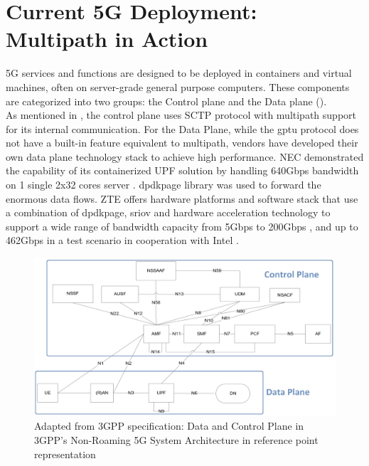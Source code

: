 \section{Current 5G Deployment: Multipath in Action}
5G services and functions are designed to be deployed in containers and virtual machines, often on server-grade general purpose computers.
These components are categorized into two groups: the Control plane and the Data plane ().
\\

As mentioned in , the control plane uses \ac{SCTP} protocol with multipath support for its internal communication.
For the Data Plane, while the \ac{gptu} protocol does not have a built-in feature equivalent to multipath, vendors have developed their own data plane technology stack to achieve high performance.
\ac{NEC} demonstrated the capability of its containerized \ac{UPF} solution by handling 640Gbps bandwidth on 1 single 2x32 cores server \cite{nec_upf_whitepaper}.
\ac{dpdkpage} library was used to forward the enormous data flows.
\ac{ZTE} offers hardware platforms and software stack that use a combination of \ac{dpdkpage}, \ac{sriov} and hardware acceleration technology to support a wide range of bandwidth capacity from 5Gbps to 200Gbps \cite{zte_upf_full_whitepaper}, and up to 462Gbps in a test scenario in cooperation with Intel \cite{zte_5g_core_upf_impl}.

\begin{figure}[H]
	\centering
	\includegraphics[width=1.0\textwidth]{resources/images/Non_Roaming_5G_System_Architecture_in_reference_point_representation.png}
	\caption{Adapted from 3GPP specification: Data and Control Plane in 3GPP's Non-Roaming 5G System Architecture in reference point representation \cite{3gpp_5g_system_architect_spec_release_18}}
	\label{fig:related_work:Non_Roaming_5G_System_Architecture_in_reference_point_representation}
\end{figure}

